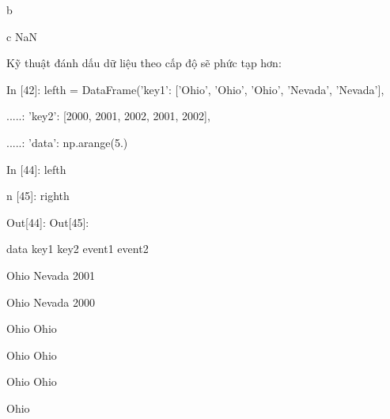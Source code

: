       \quad b \quad \quad {} \quad\quad{} \par
      \quad c \quad \quad {} \quad\quad\quad NaN \par
     Kỹ thuật đánh dấu dữ liệu theo cấp độ sẽ phức tạp hơn: \par
     \quad\textup{In [42]: lefth = DataFrame({'key1': ['Ohio', 'Ohio', 'Ohio', 'Nevada', 'Nevada'], }}\par
     \quad\quad\textup{.....: \quad\quad\quad\quad\quad\quad\quad\quad 'key2': [2000, 2001, 2002, 2001, 2002],}\par
     \quad\quad\textup{.....: \quad\quad\quad\quad\quad\quad\quad\quad 'data': np.arange(5.)}\par
    \quad\textup{In [44]: lefth}\par
    \quad\textup{n [45]: righth}\par
    \quad\textup{Out[44]: \quad\quad\quad\quad\quad Out[45]:}\par
     \quad \quad \quad data \quad\quad key1 \quad\quad key2 \quad\quad\quad\quad\quad\quad\quad\quad\quad\quad event1 \quad event2 \par
      \quad \quad {} \quad Ohio \quad{} \quad \quad \quad Nevada 2001 \quad \quad {} \quad \quad {} \par
      \quad \quad {} \quad Ohio \quad{} \quad \quad \quad Nevada 2000 \quad \quad {} \quad \quad {} \par
      \quad \quad {} \quad Ohio \quad{} \quad \quad \quad Ohio \quad \quad {} \quad \quad {} \par
      \quad \quad {} \quad Ohio \quad{} \quad \quad \quad Ohio \quad \quad {} \quad \quad {} \par
      \quad \quad {} \quad Ohio \quad{} \quad \quad \quad Ohio \quad \quad {} \quad \quad {} \par
     \quad  \quad \quad \quad  \quad \quad\quad \quad\quad\quad\quad \quad\quad \quad \quad \quad Ohio \quad \quad {} \quad {} \\\par
     
